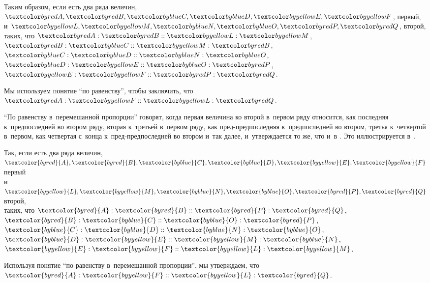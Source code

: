 \documentclass[letters]{byrne-book}
\begin{document}
\begin{center}
Таким образом, если есть два ряда величин,\\
$\varA, \varB, \varC, \varD, \varE, \varF$, первый,\\
и $\varL, \varM, \varN, \varO, \varP, \varQ$, второй,\\
таких, что $\varA : \varB :: \varL : \varM$, $\varB : \varC :: \varM : \varB$, $\varC : \varD :: \varN : \varO$, $\varD : \varE :: \varO : \varP$, $\varE : \varF :: \varP : \varQ$.

Мы используем понятие \enquote{по равенству}, чтобы заключить, что $\varA : \varF :: \varL : \varQ$.
\end{center}

\vfill\pagebreak

\label{def:V.XX}
\def\varA{\textcolor{byred}{A}}
\def\varB{\textcolor{byred}{B}}
\def\varC{\textcolor{byblue}{C}}
\def\varD{\textcolor{byblue}{D}}
\def\varE{\textcolor{byyellow}{E}}
\def\varF{\textcolor{byyellow}{F}}
\def\varL{\textcolor{byyellow}{L}}
\def\varM{\textcolor{byyellow}{M}}
\def\varN{\textcolor{byblue}{N}}
\def\varO{\textcolor{byblue}{O}}
\def\varP{\textcolor{byred}{P}}
\def\varQ{\textcolor{byred}{Q}}
\enquote{По равенству в~перемешанной пропорции} говорят, когда первая величина ко второй в~первом ряду относится, как последняя к~предпоследней во втором ряду, вторая к~третьей в~первом ряду, как пред-предпоследняя к~предпоследней во втором, третья к~четвертой в~первом, как четвертая с~конца к~пред-предпоследней во втором и~так далее, и~утверждается то же, что и~в . Это иллюстрируется в~.

\begin{center}
Так, если есть два ряда величин,\\
$\varA, \varB, \varC, \varD, \varE, \varF$ первый\\
и $\varL, \varM, \varN, \varO, \varP, \varQ$ второй,\\
таких, что $\varA : \varB :: \varP : \varQ$, $\varB : \varC :: \varO : \varP$, $\varC : \varD :: \varN : \varO$, $\varD : \varE :: \varM : \varN$, $\varE : \varF :: \varL : \varM$.

Используя понятие \enquote{по равенству в~перемешанной пропорции}, мы утверждаем, что $\varA : \varF :: \varL : \varQ$.
\end{center}

\vfill\pagebreak

\label{prop:V.XX}
\end{document}

